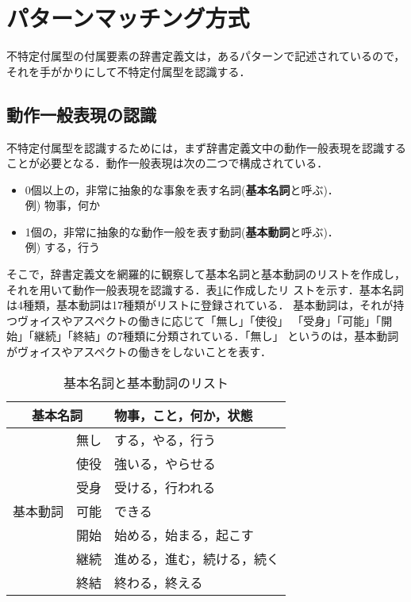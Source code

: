 \documentclass{nlp}
\begin{document}
\section{パターンマッチング方式}
不特定付属型の付属要素の辞書定義文は，あるパターンで記述されているので，
それを手がかりにして不特定付属型を認識する．

\subsection{動作一般表現の認識}
不特定付属型を認識するためには，まず辞書定義文中の動作一般表現を認識する
ことが必要となる．動作一般表現は次の二つで構成されている．
\begin{itemize}
 \item 0個以上の，非常に抽象的な事象を表す名詞({\bf 基本名詞}と呼ぶ)．\\
       例) 物事，何か
 \item 1個の，非常に抽象的な動作一般を表す動詞({\bf 基本動詞}と呼ぶ)．\\
       例) する，行う
\end{itemize}
そこで，辞書定義文を網羅的に観察して基本名詞と基本動詞のリストを作成し，
それを用いて動作一般表現を認識する．表\ref{table:verb_list}に作成したリ
ストを示す．基本名詞は4種類，基本動詞は17種類がリストに登録されている．
基本動詞は，それが持つヴォイスやアスペクトの働きに応じて「無し」「使役」
「受身」「可能」「開始」「継続」「終結」の7種類に分類されている．「無し」
というのは，基本動詞がヴォイスやアスペクトの働きをしないことを表す．


\begin{table}[h]
 \caption{基本名詞と基本動詞のリスト}
 \label{table:verb_list}
 \begin{center}
  \begin{tabular}{l|l|l}\hline
   \multicolumn{2}{c|}{基本名詞} & 物事，こと，何か，状態 \\ \hline\hline
   & 無し  & する，やる，行う \\ \cline{2-3}
   & 使役  & 強いる，やらせる \\ \cline{2-3}
   & 受身  & 受ける，行われる \\ \cline{2-3}
   基本動詞 & 可能  & できる           \\ \cline{2-3}
   & 開始  & 始める，始まる，起こす \\ \cline{2-3}
   & 継続  & 進める，進む，続ける，続く \\ \cline{2-3}
   & 終結  & 終わる，終える \\ \hline
  \end{tabular}
 \end{center}
\end{table}
\end{document}

